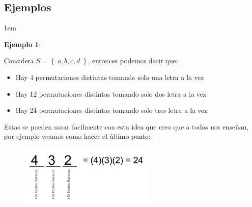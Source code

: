 \documentclass[12pt, fleqn]{report}                             %
\newenvironment{SmallIndentation}[1][0.75em]                    %
        {\begin{adjustwidth}{#1}{}\begin{footnotesize}}             %
        {\end{footnotesize}\end{adjustwidth}}                       %
\theoremstyle{break}                                            %
\newcommand{\Set}[1]{\left\{ \; #1 \; \right\}}                 %
\begin{document}
            \vspace{1em}
            \subsection{Ejemplos}

                \begin{SmallIndentation}[1em]
                    \textbf{Ejemplo 1}:
                    
                    Considera $S = \Set{a, b, c, d}$, entonces podemos decir que:
                    \begin{itemize}
                        \item Hay 4 permutaciones distintas tomando solo una letra a la vez
                        \item Hay 12 permutaciones distintas tomando solo dos letra a la vez
                        \item Hay 24 permutaciones distintas tomando solo tres letra a la vez
                    \end{itemize}

                    Estas se pueden sacar facilmente con esta idea que creo que a todos nos enseñan,
                    por ejemplo veamos como hacer el último punto:
                    \begin{figure}[h]
                        \includegraphics[width=0.6\textwidth]{PermutacionesEjemplo}
                    \end{figure}
                    
                
                \end{SmallIndentation}


        \clearpage
\end{document}
